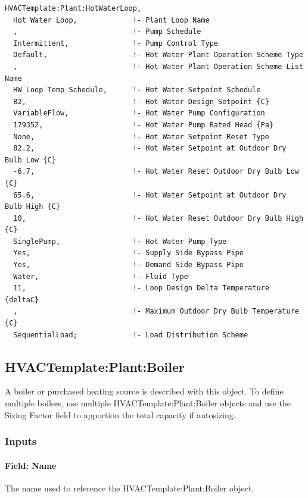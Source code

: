 \begin{lstlisting}
HVACTemplate:Plant:HotWaterLoop,
  Hot Water Loop,             !- Plant Loop Name
  ,                           !- Pump Schedule
  Intermittent,               !- Pump Control Type
  Default,                    !- Hot Water Plant Operation Scheme Type
  ,                           !- Hot Water Plant Operation Scheme List Name
  HW Loop Temp Schedule,      !- Hot Water Setpoint Schedule
  82,                         !- Hot Water Design Setpoint {C}
  VariableFlow,               !- Hot Water Pump Configuration
  179352,                     !- Hot Water Pump Rated Head {Pa}
  None,                       !- Hot Water Setpoint Reset Type
  82.2,                       !- Hot Water Setpoint at Outdoor Dry Bulb Low {C}
  -6.7,                       !- Hot Water Reset Outdoor Dry Bulb Low {C}
  65.6,                       !- Hot Water Setpoint at Outdoor Dry Bulb High {C}
  10,                         !- Hot Water Reset Outdoor Dry Bulb High {C}
  SinglePump,                 !- Hot Water Pump Type
  Yes,                        !- Supply Side Bypass Pipe
  Yes,                        !- Demand Side Bypass Pipe
  Water,                      !- Fluid Type
  11,                         !- Loop Design Delta Temperature {deltaC}
  ,                           !- Maximum Outdoor Dry Bulb Temperature {C}
  SequentialLoad;             !- Load Distribution Scheme
\end{lstlisting}

\subsection{HVACTemplate:Plant:Boiler}\label{hvactemplateplantboiler}

A boiler or purchased heating source is described with this object. To define multiple boilers, use multiple HVACTemplate:Plant:Boiler objects and use the Sizing Factor field to apportion the total capacity if autosizing.

\subsubsection{Inputs}\label{inputs-29-000}

\paragraph{Field: Name}\label{field-name-16-003}

The name used to reference the HVACTemplate:Plant:Boiler object.

